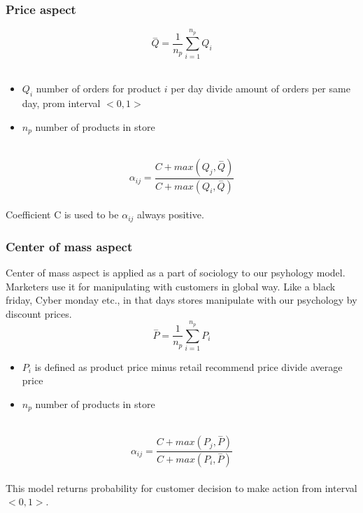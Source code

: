 \subsubsection{Price aspect} \label{subsubsec:model_psychology_price}
\begin{equation} \label{eq:26}
\overset{-}{Q} = \frac{1}{n_p} \sum_{i=1}^{n_p} Q_i
\end{equation}
\\
\begin{itemize}
    \item $Q_i$ number of orders for product $i$ per day divide amount of orders per same day, prom interval $<0,1>$
    \item $n_p$ number of products in store
\end{itemize}
\\
\begin{equation} \label{eq:27}
\alpha_{ij} = \frac{C+max(Q_j, \overset{-}{Q})}{C+max(Q_i, \overset{-}{Q})}
\end{equation}
\\
Coefficient C is used to be $\alpha_{ij}$ always positive.
\subsubsection{Center of mass aspect} \label{subsubsec:model_psychology_mass}
Center of mass aspect is applied as a part of sociology to our psyhology model.
Marketers use it for manipulating with customers in global way.
Like a black friday, Cyber monday etc., in that days stores manipulate with our psychology by discount prices.
\\
\begin{equation} \label{eq:28}
\overset{-}{P} = \frac{1}{n_p} \sum_{i=1}^{n_p} P_i
\end{equation}
\begin{itemize}
    \item $P_i$ is defined as product price minus retail recommend price divide average price
    \item $n_p$ number of products in store
\end{itemize}
\\
\begin{equation} \label{eq:29}
\alpha_{ij} = \frac{C+max(P_j, \overset{-}{P})}{C+max(P_i, \overset{-}{P})}
\end{equation}
\\
This model returns probability for customer decision to make action from interval $<0,1>$.
\\
